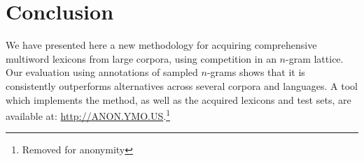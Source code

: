 \documentclass[11pt,letterpaper]{article}
\begin{document}
\section{Conclusion}

We have presented here a new methodology for acquiring comprehensive multiword lexicons from large corpora, using competition in an $n$-gram lattice. Our evaluation using annotations of sampled $n$-grams shows that it is consistently outperforms alternatives across several corpora and languages. A tool which implements the method, as well as the acquired lexicons and test sets, are available at: \url{http://ANON.YMO.US}.\footnote{Removed for anonymity} 




\end{document}
